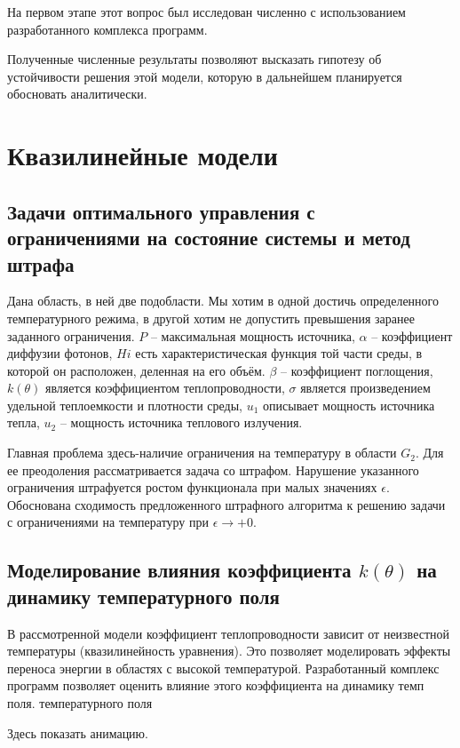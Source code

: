 \documentclass[8pt,a4paper]{article}
\begin{document}
    На первом этапе этот вопрос был исследован численно с использованием
    разработанного комплекса программ.

    Полученные численные результаты позволяют высказать гипотезу
    об устойчивости решения этой модели, которую в дальнейшем планируется обосновать аналитически.


    \vspace{10cm}
    \section*{Квазилинейные модели}
    \subsection*{Задачи оптимального управления с ограничениями на состояние системы и метод штрафа}
        Дана область, в ней две подобласти. Мы хотим в одной достичь определенного температурного режима,
    в другой хотим не допустить превышения заранее заданного ограничения.
    $P$ – максимальная мощность источника,
    $\alpha$ – коэффициент диффузии фотонов,
    $Hi$ есть характеристическая функция той части среды, в которой он расположен, деленная на его объём.
    $\beta$ – коэффициент поглощения, $k(\theta)$ является коэффициентом теплопроводности,
    $\sigma$ является произведением удельной теплоемкости и плотности среды,
    $u_1$ описывает мощность источника тепла, $u_2$ – мощность источника теплового излучения.

    Главная проблема здесь-наличие ограничения на температуру в области $G_2$.
    Для ее преодоления рассматривается задача со штрафом.
    Нарушение указанного ограничения штрафуется ростом функционала при малых значениях $\epsilon$.
    Обоснована сходимость предложенного штрафного алгоритма к решению задачи
    с ограничениями на температуру при $\epsilon\to+0$.


    \vspace{10cm}
    \subsection*{Моделирование влияния коэффициента $k(\theta)$ на динамику температурного поля}
        В рассмотренной модели коэффициент теплопроводности зависит от
    неизвестной температуры (квазилинейность уравнения).
    Это позволяет моделировать эффекты переноса энергии в областях с высокой температурой.
    Разработанный комплекс программ позволяет оценить
    влияние этого коэффициента на динамику темп поля.
    температурного поля

    Здесь показать анимацию.
\end{document}
